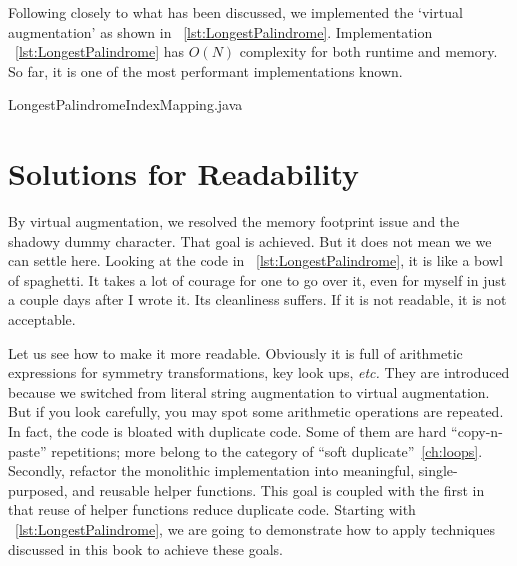 Following closely to what has been discussed, we implemented the `virtual augmentation' as
shown in ~\autoref{lst:LongestPalindrome}.
Implementation ~\autoref{lst:LongestPalindrome} has $O(N)$ complexity for both runtime and memory.
So far, it is one of the most performant implementations known.

\begin{clisting}[H]
    
    {LongestPalindromeIndexMapping.java}
\end{clisting}

\section{Solutions for Readability}\label{sec:palindrom.modularized}

By virtual augmentation, we resolved the memory footprint issue and the shadowy dummy character.
That goal is achieved.
But it does not mean we we can settle here.
Looking at the code in ~\autoref{lst:LongestPalindrome}, it is like a bowl of spaghetti.
It takes a lot of courage for one to go over it, even for myself in just a couple days after I wrote
it.
Its cleanliness suffers.
If it is not readable, it is not acceptable.


Let us see how to make it more readable.
Obviously it is full of arithmetic expressions for symmetry
transformations, key look ups, \textit{etc.}
They are introduced because we switched from literal string augmentation to virtual augmentation.
But if you look carefully, you may spot some arithmetic operations are repeated.
In fact, the code is bloated with duplicate code.
Some of them are hard ``copy-n-paste'' repetitions;
more belong to the category of ``soft duplicate''~\autoref{ch:loops}.
Secondly, refactor the monolithic implementation into meaningful, single-purposed, and reusable
helper functions.
This goal is coupled with the first in that reuse of helper functions reduce duplicate code.
Starting with ~\autoref{lst:LongestPalindrome}, we are going to demonstrate
how to apply techniques discussed in this book to achieve these goals.


